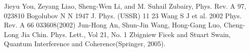 \documentclass{article}
\begin{document}
\begin{thebibliography}{99}
 Jieyu You, Zeyang Liao, Sheng-Wen Li, and M. Suhail Zubairy, Phys. Rev. A 97, 023810 
 Bogolubov N N 1947 J. Phys. (USSR) 11 23
 Wang S J et al. 2002 Phys. Rev. A 66 033608(2002)
 Jun-Hong An, Shun-Jin Wang, Hong-Gang Luo, Cheng-Long Jia Chin. Phys. Lett., Vol 21, No. 1
 Zbigniew Ficek and Stuart Swain, Quantum Interference
and Coherence(Springer, 2005).

\end{thebibliography} 
\end{document}
